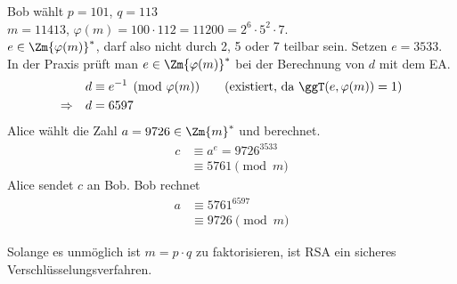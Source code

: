 \begin{beispiel}
Bob wählt $p = 101$, $q = 113$\\
$m = 11413$, \quad $\varphi(m) = 100 \cdot 112 = 11200 = 2^6 \cdot 5^2 \cdot 7$.\\
$e \in \Zm{\varphi(m)}^*$, darf also nicht durch 2, 5 oder 7 teilbar sein. Setzen $e = 3533$.\\
In der Praxis prüft man $e \in \Zm{\varphi(m)}^*$ bei der Berechnung von $d$ mit dem EA.
\begin{align*}
  & d \equiv e^{-1} \pmod{\varphi(m)} \qquad (\text{existiert, da } \ggT(e, \varphi(m)) = 1) \\
  \Rightarrow\quad & d = 6597
\end{align*}
Alice wählt die Zahl $a = 9726 \in \Zm{m}^*$ und berechnet.
\begin{align*}
  c &\equiv a^e = 9726^{3533} \\
    &\equiv 5761 \pmod{m}
\end{align*}
Alice sendet $c$ an Bob. Bob rechnet
\begin{align*}
  a &\equiv 5761^{6597} \\
    &\equiv 9726 \pmod{m}
\end{align*}
\end{beispiel}

\begin{bemerkung}[Fazit]
Solange es unmöglich ist $m = p \cdot q$ zu faktorisieren, ist RSA ein sicheres Verschlüsselungsverfahren.
\end{bemerkung}
